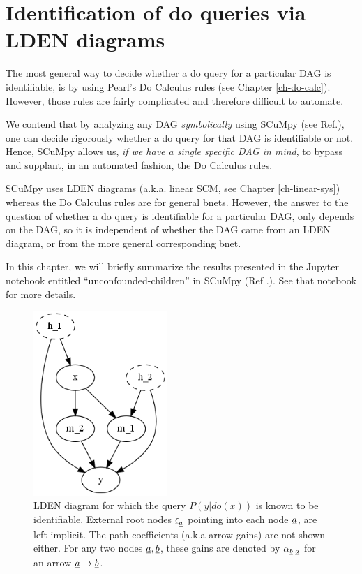 \chapter{Identification of do queries via LDEN
diagrams}
\label{ch-iden-LDEN}

The most general way to decide whether a do query for
a particular DAG is identifiable, is by using Pearl's
Do Calculus rules (see Chapter \ref{ch-do-calc}). However, those rules are fairly 
complicated and therefore difficult to automate.


We contend that by analyzing any DAG {\it symbolically} using 
SCuMpy (see Ref.\cite{scumpy}), one can decide rigorously 
whether a
do query for that DAG is identifiable or not. Hence, SCuMpy
allows us, {\it if we have a single specific DAG in mind}, to bypass and supplant, in an automated 
fashion, the Do Calculus rules.

SCuMpy uses
LDEN diagrams (a.k.a. linear SCM, see Chapter \ref{ch-linear-sys}) whereas
the Do Calculus rules are for general bnets.
However, the answer to the question
of whether a do query is identifiable
for a particular DAG,
only depends on the DAG,
so it is independent of whether
the DAG came from an LDEN diagram, or from
the more general corresponding bnet.


In this chapter,
we will briefly summarize the results
presented in the
Jupyter notebook entitled \enquote{unconfounded-children} in SCuMpy (Ref
.\cite{scumpy}). See that notebook
for more details.

\begin{figure}[h!]
\centering
\includegraphics[width=2in]
{iden-LDEN/uncon-children.png}
\caption{LDEN diagram for which 
the query $P(y|do(x))$
is  known to be identifiable.
External root nodes $\underline{\epsilon}_{\underline{a}}$ 
pointing into each node ${\underline{a}}$,
are left implicit.
The path coefficients (a.k.a
arrow gains)
are not shown either. 
For any two nodes ${\underline{a}}, {\underline{b}}$,
these gains
 are denoted
   by $\alpha_{{\underline{b}}|{\underline{a}}}$
for an arrow ${\underline{a}}\rightarrow {\underline{b}}$.}
\label{fig-uncon-children}
\end{figure}

